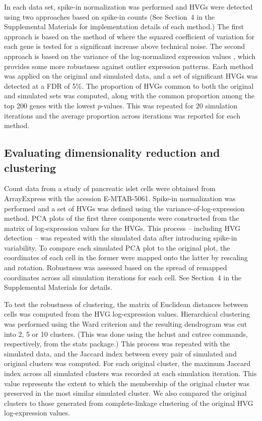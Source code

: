 \documentclass{article}
\newcommand{\suppsecsim}{4}
\begin{document}
In each data set, spike-in normalization was performed and HVGs were detected using two approaches based on spike-in counts 
(See Section~\suppsecsim{} in the Supplemental Materials for implementation details of each method.)
The first approach is based on the method of \cite{brennecke2013accounting} where the squared coefficient of variation for each gene is tested for a significant increase above technical noise.
The second approach is based on the variance of the log-normalized expression values \autocite{lun2016stepbystep}, which provides some more robustness against outlier expression patterns.
Each method was applied on the original and simulated data, and a set of significant HVGs was detected at a FDR of 5\%.
The proportion of HVGs common to both the original and simulated sets was computed, along with the common proportion among the top 200 genes with the lowest $p$-values.
This was repeated for 20 simulation iterations and the average proportion across iterations was reported for each method.

\subsection*{Evaluating dimensionality reduction and clustering}
Count data from a study of pancreatic islet cells \autocite{segerstople2016single} were obtained from ArrayExpress with the acession E-MTAB-5061.
Spike-in normalization was performed and a set of HVGs was defined using the variance-of-log-expression method.
PCA plots of the first three components were constructed from the matrix of log-expression values for the HVGs.
This process -- including HVG detection -- was repeated with the simulated data after introducing spike-in variability.
To compare each simulated PCA plot to the original plot, the coordinates of each cell in the former were mapped onto the latter by rescaling and rotation.
Robustness was assessed based on the spread of remapped coordinates across all simulation iterations for each cell.
See Section~\suppsecsim{} in the Supplemental Materials for details.

To test the robustness of clustering, the matrix of Euclidean distances between cells was computed from the HVG log-expression values. 
Hierarchical clustering was performed using the Ward criterion and the resulting dendrogram was cut into 2, 5 or 10 clusters.
(This was done using the hclust and cutree commands, respectively, from the stats package.)
This process was repeated with the simulated data, and the Jaccard index between every pair of simulated and original clusters was computed.
For each original cluster, the maximum Jaccard index across all simulated clusters was recorded at each simulation iteration.
This value represents the extent to which the membership of the original cluster was preserved in the most similar simulated cluster.
We also compared the original clusters to those generated from complete-linkage clustering of the original HVG log-expression values.
\end{document}
